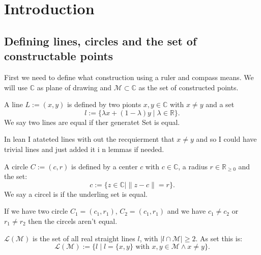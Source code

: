 \chapter{Introduction}

\section{Defining lines, circles and the set of constructable points}
First we need to define what construction using a ruler and compass means.
We will use $\mathbb{C}$ as plane of drawing and $\mathcal{M} \subset \mathbb{C}$ as the set of constructed points.

\begin{definition}[Line]
    \label{def:line}
    \leanok
    A line $L := (x,y)$ is defined by two pionts $x,y\in\mathbb{C}$ with $x\ne y$ and a set $$l:=\{\lambda x+(1-\lambda)y\mid\lambda\in\mathbb{R}\}.$$
    We say two lines are equal if ther generatet Set is equal.
\end{definition}
\begin{remark}
 In lean I atateted lines with out the recquierment that $x\ne y$ and so I could have trivial lines and just added it i n lemmas if needed.
\end{remark}


\begin{definition}[Circle]
    \label{def:circle}
    \leanok
    A circle $C := (c,r)$ is defined by a center $c$ with  $c\in\mathbb{C}$, a radius $r\in\mathbb{R}_{\ge 0}$ and the set: $$c:=\{z\in\mathbb{C} \mid\|z-c\|=r\}.$$ 
    We say a circel is if the underling set is equal.
\end{definition}

\begin{lemma}
    \label{lem:circel_not_eq_iff}
    \leanok
    If we have two circle $C_1 = (c_1,r_1)$, $C_2 = (c_1,r_1)$ and we have $c_1 \ne c_2$ or $r_1  \ne r_2 $ then the circels aren't equal. 
\end{lemma}


\begin{definition}
    \label{def:set_of_lines}
    \leanok
    $\mathcal{L(M)}$ is the set of all real straight lines $l$, with $| l\cap \mathcal{M} |\ge 2$. As set this is:
    \begin{equation*}
        \mathcal{L(M)} := \{l \mid l = \{x,y\} \text{ with }x,y \in \mathcal{M} \land x \neq y\}.
    \end{equation*}
\end{definition}

